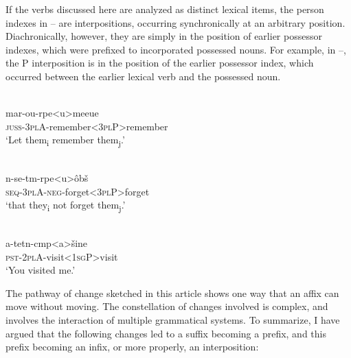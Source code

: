 \documentclass[output=paper]{LSP/langsci}
\begin{document}
If the verbs discussed here are analyzed as distinct lexical items, the person indexes in -- are interpositions, occurring synchronically at an arbitrary position. Diachronically, however, they are simply in the position of earlier possessor indexes, which were prefixed to incorporated possessed nouns. For example, in --, the P interposition is in the position of the earlier possessor index, which occurred between the earlier lexical verb and the possessed noun. 

\begin{exe}
\ex%
\label{05-gr-ex:50}
\\
\gll mar-ou-rpe<u>meeue\\
\textsc{juss}-\textsc{3pl}A-remember<\textsc{3pl}P>remember\\
\glt ‘Let them\textsubscript{i} remember them\textsubscript{j}.’ 
\end{exe}

\begin{exe}
\ex%
\label{05-gr-ex:51}
\\
\gll n-se-tm-rpe<u>ôbš\\
\textsc{seq-3pl}A\textsc{-neg}-forget<\textsc{3pl}P>forget\\
\glt ‘that they\textsubscript{i} not forget them\textsubscript{j}.’
\end{exe}

\begin{exe}
\ex%
\label{05-gr-ex:52}
\\
\gll a-tetn-cmp<a>šine\\
\textsc{pst-2pl}A-visit<\textsc{1sg}P>visit\\
\glt ‘You visited me.’
\end{exe}

The pathway of change sketched in this article shows one way that an affix can move without moving. The constellation of changes involved is complex, and involves the interaction of multiple grammatical systems. To summarize, I have argued that the following changes led to a suffix becoming a prefix, and this prefix becoming an infix, or more properly, an interposition:
\end{document}
